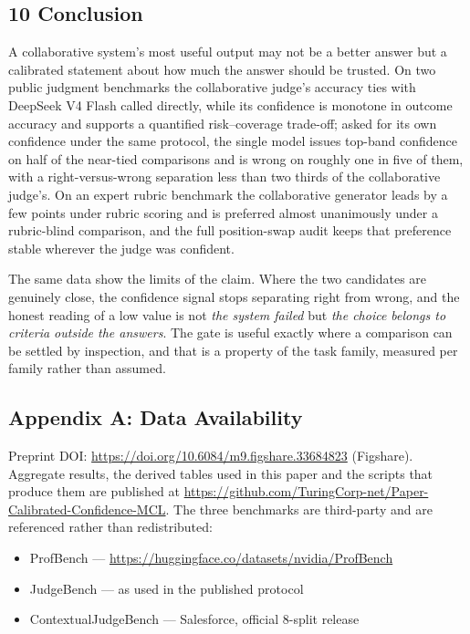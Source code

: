 \documentclass[
]{article}
\providecommand{\tightlist}{%
  \setlength{\itemsep}{0pt}\setlength{\parskip}{0pt}}
\begin{document}
\subsection{10 Conclusion}\label{conclusion}

A collaborative system's most useful output may not be a better answer but a calibrated
statement about how much the answer should be trusted. On two public judgment benchmarks
the collaborative judge's accuracy ties with DeepSeek V4 Flash called directly, while its
confidence is monotone in outcome accuracy and supports a quantified risk--coverage
trade-off; asked for its own confidence under the same protocol, the single model issues
top-band confidence on half of the near-tied comparisons and is wrong on roughly one in
five of them, with a right-versus-wrong separation less than two thirds of the
collaborative judge's. On an expert rubric benchmark the collaborative generator leads by
a few points under rubric scoring and is preferred almost unanimously under a rubric-blind
comparison, and the full position-swap audit keeps that preference stable wherever the
judge was confident.

The same data show the limits of the claim. Where the two candidates are genuinely close,
the confidence signal stops separating right from wrong, and the honest reading of a low
value is not \emph{the system failed} but \emph{the choice belongs to criteria outside the
answers}. The gate is useful exactly where a comparison can be settled by inspection, and
that is a property of the task family, measured per family rather than assumed.

\subsection{Appendix A: Data Availability}\label{data-availability}

Preprint DOI: \url{https://doi.org/10.6084/m9.figshare.33684823} (Figshare). Aggregate results, the derived tables used in this
paper and the scripts that produce them are published at
\url{https://github.com/TuringCorp-net/Paper-Calibrated-Confidence-MCL}. The three
benchmarks are third-party and are referenced rather than redistributed:

\begin{itemize}
\tightlist
\item
  ProfBench --- \url{https://huggingface.co/datasets/nvidia/ProfBench}
\item
  JudgeBench --- as used in the published protocol
\item
  ContextualJudgeBench --- Salesforce, official 8-split release
\end{itemize}
\end{document}
